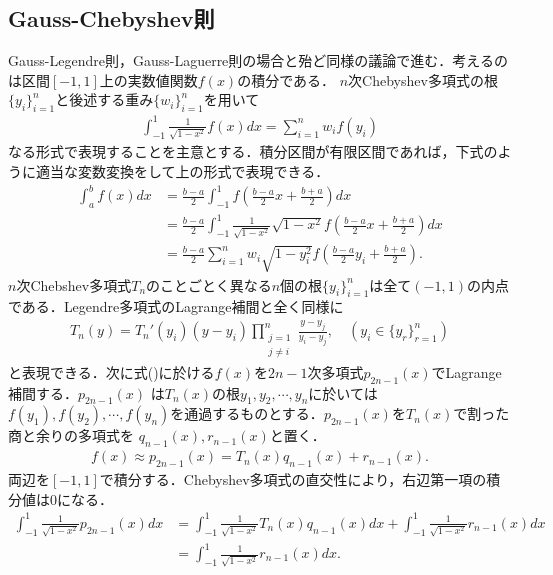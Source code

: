 \documentclass[a4j,papersize,disablejfam,slide,14pt]{jsarticle}
\begin{document}
\subsection{{\rm Gauss-Chebyshev}則}
	{\rm Gauss-Legendre}則，{\rm Gauss-Laguerre}則の場合と殆ど同様の議論で進む．考えるのは区間$[-1,1]$上の実数値関数$f(x)$の積分である．
    $n$次{\rm Chebyshev}多項式の根$\{y_i\}_{i=1}^{n}$と後述する重み$\{w_i\}_{i=1}^{n}$を用いて
    \begin{align}
    	\int_{-1}^{1} \frac{1}{\sqrt{1-x^2}} f(x) dx = \sum_{i=1}^{n} w_i f(y_i) \label{eq:gauss_chebyshev_model}
    \end{align}
    なる形式で表現することを主意とする．積分区間が有限区間であれば，下式のように適当な変数変換をして上の形式で表現できる．
    \begin{align}
    	\int_{a}^{b} f(x)dx &= \frac{b-a}{2} \int_{-1}^{1} f\left( \frac{b-a}{2}x + \frac{b+a}{2} \right) dx \\
        &= \frac{b-a}{2} \int_{-1}^{1} \frac{1}{\sqrt{1-x^2}} \sqrt{1-x^2} f\left( \frac{b-a}{2}x + \frac{b+a}{2} \right) dx \\
        &= \frac{b-a}{2} \sum_{i=1}^{n} w_i \sqrt{1-y_i^2} f\left( \frac{b-a}{2}y_i + \frac{b+a}{2} \right).
    \end{align}
    $n$次{\rm Chebshev}多項式$T_n$のことごとく異なる$n$個の根$\{y_i\}_{i=1}^{n}$は全て$(-1,1)$の内点である．{\rm Legendre}多項式の{\rm Lagrange}補間と全く同様に
    \begin{align}
    	T_n(y) = T_n'(y_i)(y - y_i)\prod_{\substack{j=1 \\ j \neq i}}^{n} \frac{y-y_j}{y_i - y_j}, \quad(y_i \in \{y_r\}_{r=1}^{n})
    \end{align}
    と表現できる．次に式()に於ける$f(x)$を$2n-1$次多項式$p_{2n-1}(x)$で{\rm Lagrange}補間する．$p_{2n-1}(x)$
    は$T_n(x)$の根$y_1, y_2, \cdots, y_n$に於いては$f(y_1), f(y_2), \cdots, f(y_n)$を通過するものとする．$p_{2n-1}(x)$を$T_n(x)$で割った商と余りの多項式を
    $q_{n-1}(x), r_{n-1}(x)$と置く．
    \begin{align}
    	f(x) \approx p_{2n-1}(x) = T_n(x)q_{n-1}(x) + r_{n-1}(x).
    \end{align}
    両辺を$[-1,1]$で積分する．{\rm Chebyshev}多項式の直交性により，右辺第一項の積分値は$0$になる．
    \begin{align}
    	\int_{-1}^{1} \frac{1}{\sqrt{1-x^2}} p_{2n-1}(x) dx 
        &= \int_{-1}^{1} \frac{1}{\sqrt{1-x^2}} T_n(x)q_{n-1}(x) dx + \int_{-1}^{1} \frac{1}{\sqrt{1-x^2}} r_{n-1}(x) dx \\
        &= \int_{-1}^{1} \frac{1}{\sqrt{1-x^2}} r_{n-1}(x) dx.
    \end{align}
\end{document}

